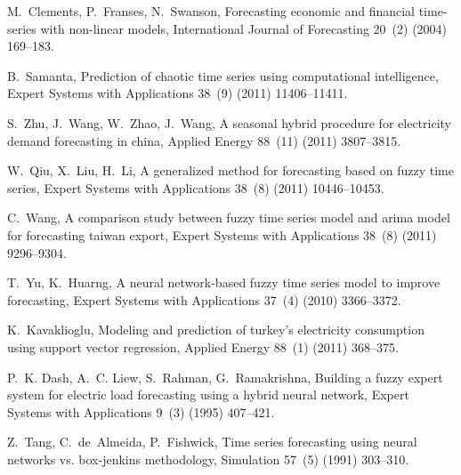 \documentclass[runningheads]{llncs}
\begin{document}
\begin{thebibliography}{x}
M.~Clements, P.~Franses, N.~Swanson, Forecasting economic and financial
  time-series with non-linear models, International Journal of Forecasting
  20~(2) (2004) 169--183.

B.~Samanta, Prediction of chaotic time series using computational intelligence,
  Expert Systems with Applications 38~(9) (2011) 11406--11411.

S.~Zhu, J.~Wang, W.~Zhao, J.~Wang, A seasonal hybrid procedure for electricity
  demand forecasting in china, Applied Energy 88~(11) (2011) 3807--3815.

W.~Qiu, X.~Liu, H.~Li, A generalized method for forecasting based on fuzzy time
  series, Expert Systems with Applications 38~(8) (2011) 10446--10453.

C.~Wang, A comparison study between fuzzy time series model and arima model for
  forecasting taiwan export, Expert Systems with Applications 38~(8) (2011)
  9296--9304.

T.~Yu, K.~Huarng, A neural network-based fuzzy time series model to improve
  forecasting, Expert Systems with Applications 37~(4) (2010) 3366--3372.

K.~Kavaklioglu, Modeling and prediction of turkey's electricity consumption
  using support vector regression, Applied Energy 88~(1) (2011) 368--375.

P.~K. Dash, A.~C. Liew, S.~Rahman, G.~Ramakrishna, Building a fuzzy expert
  system for electric load forecasting using a hybrid neural network, Expert
  Systems with Applications 9~(3) (1995) 407--421.

Z.~Tang, C.~de~Almeida, P.~Fishwick, Time series forecasting using neural
  networks vs. box-jenkins methodology, Simulation 57~(5) (1991) 303--310.





\end{thebibliography}
\end{document}
